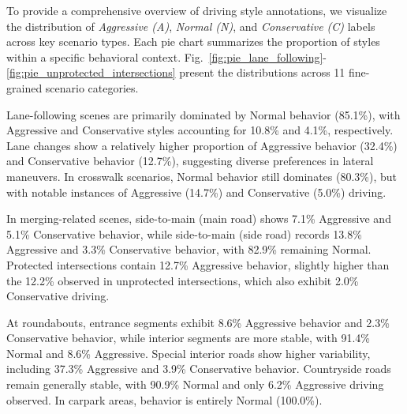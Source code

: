 \documentclass{article}
\begin{document}
To provide a comprehensive overview of driving style annotations, we visualize the distribution of \textit{Aggressive (A)}, \textit{Normal (N)}, and \textit{Conservative (C)} labels across key scenario types. Each pie chart summarizes the proportion of styles within a specific behavioral context. Fig.~\ref{fig:pie_lane_following}-\ref{fig:pie_unprotected_intersections} present the distributions across 11 fine-grained scenario categories.

Lane-following scenes are primarily dominated by Normal behavior (85.1\%), with Aggressive and Conservative styles accounting for 10.8\% and 4.1\%, respectively. Lane changes show a relatively higher proportion of Aggressive behavior (32.4\%) and Conservative behavior (12.7\%), suggesting diverse preferences in lateral maneuvers. In crosswalk scenarios, Normal behavior still dominates (80.3\%), but with notable instances of Aggressive (14.7\%) and Conservative (5.0\%) driving.

In merging-related scenes, side-to-main (main road) shows 7.1\% Aggressive and 5.1\% Conservative behavior, while side-to-main (side road) records 13.8\% Aggressive and 3.3\% Conservative behavior, with 82.9\% remaining Normal. Protected intersections contain 12.7\% Aggressive behavior, slightly higher than the 12.2\% observed in unprotected intersections, which also exhibit 2.0\% Conservative driving.

At roundabouts, entrance segments exhibit 8.6\% Aggressive behavior and 2.3\% Conservative behavior, while interior segments are more stable, with 91.4\% Normal and 8.6\% Aggressive. Special interior roads show higher variability, including 37.3\% Aggressive and 3.9\% Conservative behavior. Countryside roads remain generally stable, with 90.9\% Normal and only 6.2\% Aggressive driving observed. In carpark areas, behavior is entirely Normal (100.0\%).
\end{document}
